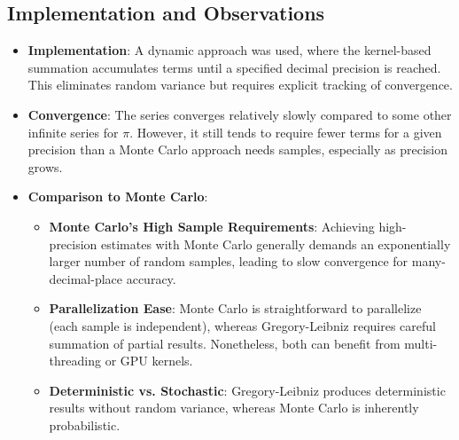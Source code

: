 \documentclass[12pt]{article}
\begin{document}
\subsection{Implementation and Observations}
\begin{itemize}
      \item \textbf{Implementation}: A dynamic approach was used, where the kernel-based
            summation accumulates terms until a specified decimal precision is reached.
            This eliminates random variance but requires explicit tracking of convergence.
      \item \textbf{Convergence}: The series converges relatively slowly compared to some
            other infinite series for \(\pi\). However, it still tends to require fewer
            terms for a given precision than a Monte Carlo approach needs samples,
            especially as precision grows.
      \item \textbf{Comparison to Monte Carlo}:
            \begin{itemize}
                  \item \textbf{Monte Carlo’s High Sample Requirements}: Achieving
                        high-precision estimates with Monte Carlo generally demands an
                        exponentially larger number of random samples, leading to slow
                        convergence for many-decimal-place accuracy.
                  \item \textbf{Parallelization Ease}: Monte Carlo is straightforward to
                        parallelize (each sample is independent), whereas Gregory-Leibniz
                        requires careful summation of partial results. Nonetheless, both can
                        benefit from multi-threading or GPU kernels.
                  \item \textbf{Deterministic vs. Stochastic}: Gregory-Leibniz produces
                        deterministic results without random variance, whereas Monte Carlo
                        is inherently probabilistic.
            \end{itemize}
\end{itemize}
\end{document}
